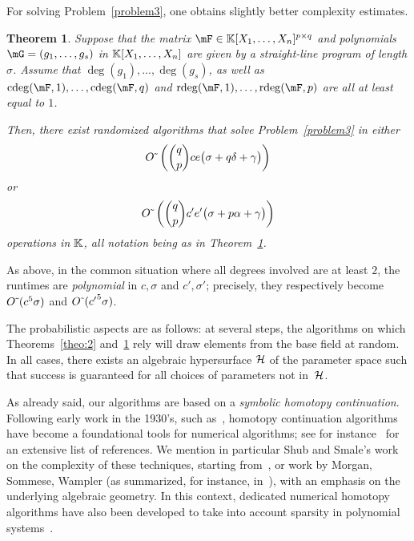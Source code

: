 \documentclass[12pt]{article}
\newtheorem{theorem}[definition]{Theorem}
\begin{document}
For solving Problem~\eqref{problem3}, one obtains slightly better
complexity estimates. 

\begin{theorem}\label{theo:3}
  Suppose that the matrix $\mF \in \KK[X_1,\dots,X_n]^{p \times q}$
  and polynomials $\mG=(g_1,\dots,g_s)$ in $\mathbb{K}[X_1,\dots,X_n]$ are
  given by a straight-line program of length $\sigma$. Assume that
  $\deg(g_1),\dots,\deg(g_s)$, as well as
  $\cdeg(\mF,1), \ldots, \cdeg(\mF,q)$ and
  $\rdeg(\mF,1), \ldots, \rdeg(\mF,p)$ are all at least equal to $1$.

  Then, there exist randomized algorithms that solve
  Problem~\eqref{problem3} in either
   $${O}{\,\tilde{ }\,}\left (
     {q \choose p} ce\big(\sigma + q \delta + \gamma  \big )
   \right)$$
or 
   $${O}{\,\tilde{ }\,}\left (
     {q \choose p} c'e'\big(\sigma + p \alpha  +\gamma \big )
   \right)$$
  operations in $\mathbb{K}$, 
  all notation being as in Theorem~\ref{theo:3}.
\end{theorem}
As above, in the common situation where all degrees involved are at
least $2$, the runtimes are {\it polynomial} in $c, \sigma$ and
$c',\sigma'$; precisely, they respectively become ${O}{\,\tilde{ }\,} (c^5 \sigma)$ and ${O}{\,\tilde{ }\,}
({c'}^5 \sigma)$.


The probabilistic aspects are as follows: at several steps, the
algorithms on which Theorems~\ref{theo:2} and~\ref{theo:3} rely will
draw elements from the base field at random. In all cases, there
exists an algebraic hypersurface $\cal H$ of the parameter space such
that success is guaranteed for all choices of parameters not
in~$\cal H$.



As already said, our algorithms are based on a {\em symbolic homotopy
  continuation}. Following early work in the 1930's, such
as~\cite{Lahaye34}, homotopy continuation algorithms have become a
foundational tools for numerical algorithms; see for
instance~\cite{AlGe03} for an extensive list of references.  We
mention in particular Shub and Smale's work on the complexity of these
techniques, starting from~\cite{ShSm93}, or work by Morgan, Sommese,
Wampler (as summarized, for instance, in~\cite{BertiniBook,SoWa05}),
with an emphasis on the underlying algebraic geometry. In this
context, dedicated numerical homotopy algorithms have also been
developed to take into account sparsity in polynomial
systems~\cite{Ver94,Ver09,AdVe13}.
\end{document}
